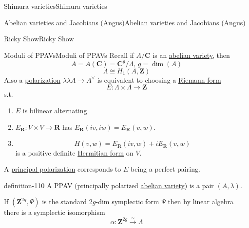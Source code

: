 \documentclass[10pt,]{book}
\numberwithin{equation}{section}
\newcommand{\ZZ}{\mathbf{Z}}
\newcommand{\RR}{\mathbf{R}}
\newcommand{\CC}{\mathbf{C}}
\begin{document}
\begin{chapterptx}{Shimura varieties}{}{Shimura varieties}{}{}
\begin{sectionptx}{Abelian varieties and Jacobians (Angus)}{}{Abelian varieties and Jacobians (Angus)}{}{}
\end{sectionptx}
%
%
\typeout{************************************************}
\typeout{************************************************}
%
\begin{sectionptx}{Ricky Show}{}{Ricky Show}{}{}\label{sec-buntes-hs}
%
%
\typeout{************************************************}
\typeout{************************************************}
%
\begin{subsectionptx}{Moduli of PPAVs}{}{Moduli of PPAVs}{}{}\label{subsection-80}
\hypertarget{p-1124}{}%
Recall if \(A/ \CC\) is an \hyperref[def-buntes-abvar]{abelian variety},  then%
\begin{equation*}
A = A(\CC) =  \CC^g/ \Lambda, \,g = \dim (A)
\end{equation*}
%
\begin{equation*}
\Lambda \cong H_1(A,\ZZ)
\end{equation*}
Also a \hyperref[def-polarization]{polarization} \(\lambda \lambda A \to A^\vee\) is equivalent to choosing a \hyperref[def-riemann-form]{Riemann form}%
\begin{equation*}
E \colon \Lambda \times \Lambda \to \ZZ
\end{equation*}
s.t.\leavevmode%
\begin{enumerate}
\item\hypertarget{li-278}{}\(E\) is bilinear alternating%
\item\hypertarget{li-279}{}\(E_\RR \colon V\times V \to \RR\) has \(E_\RR(iv,iw)  = E_\RR( v,w)\).%
\item\hypertarget{li-280}{}%
\begin{equation*}
H(v,w) = E_\RR(iv, w) + i E_\RR(v,w)
\end{equation*}
is a positive definite \hyperref[sec-buntes-av-jac]{Hermitian form} on \(V\).%
\end{enumerate}
A \hyperref[def-polarization]{principal polarization} corresponds to \(E\) being a perfect pairing.%
\begin{definition}{}{definition-110}%
\hypertarget{p-1125}{}%
A PPAV (principally polarized \hyperref[def-buntes-abvar]{abelian variety}) is a pair \((A,\lambda)\).%
\end{definition}
\hypertarget{p-1126}{}%
If \((\ZZ^{2g}, \Psi)\) is the standard \(2g\)-dim symplectic form \(\Psi\) then by linear algebra there is a symplectic isomorphism%
\begin{equation*}
\alpha \colon \ZZ^{2g} \xrightarrow\sim \Lambda

\end{equation*}
\end{subsectionptx}
\end{sectionptx}
\end{chapterptx}
\end{document}
